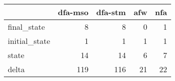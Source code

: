 \begin{tabular}{lrrrr}
\toprule
{} &  dfa-mso &  dfa-stm &  afw &  nfa \\
\midrule
final\_state   &        8 &        8 &    0 &    1 \\
initial\_state &        1 &        1 &    1 &    1 \\
state         &       14 &       14 &    6 &    7 \\
delta         &      119 &      116 &   21 &   22 \\
\bottomrule
\end{tabular}

